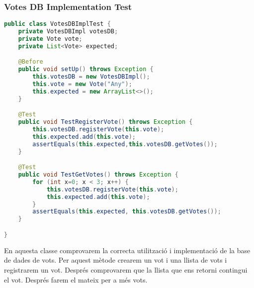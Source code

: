 \documentclass[11pt]{article}
\begin{document}
	\subsubsection{Votes DB Implementation Test}
	\begin{lstlisting}[basicstyle=\ttfamily\scriptsize,language=Java]
public class VotesDBImplTest {
    private VotesDBImpl votesDB;
    private Vote vote;
    private List<Vote> expected;

    @Before
    public void setUp() throws Exception {
        this.votesDB = new VotesDBImpl();
        this.vote = new Vote("Any");
        this.expected = new ArrayList<>();
    }

    @Test
    public void TestRegisterVote() throws Exception {
        this.votesDB.registerVote(this.vote);
        this.expected.add(this.vote);
        assertEquals(this.expected,this.votesDB.getVotes());
    }

    @Test
    public void TestGetVotes() throws Exception {
        for (int x=0; x < 3; x++) {
            this.votesDB.registerVote(this.vote);
            this.expected.add(this.vote);
        }
        assertEquals(this.expected, this.votesDB.getVotes());
    }

}
	\end{lstlisting}
	En aquesta classe comprovarem la correcta utilització i implementació de la base de dades de vots. Per aquest mètode crearem un vot i una llista de vots i registrarem un vot. Després comprovarem que la llista que ens retorni contingui el vot. Després farem el mateix per a més vots.	
\end{document}
